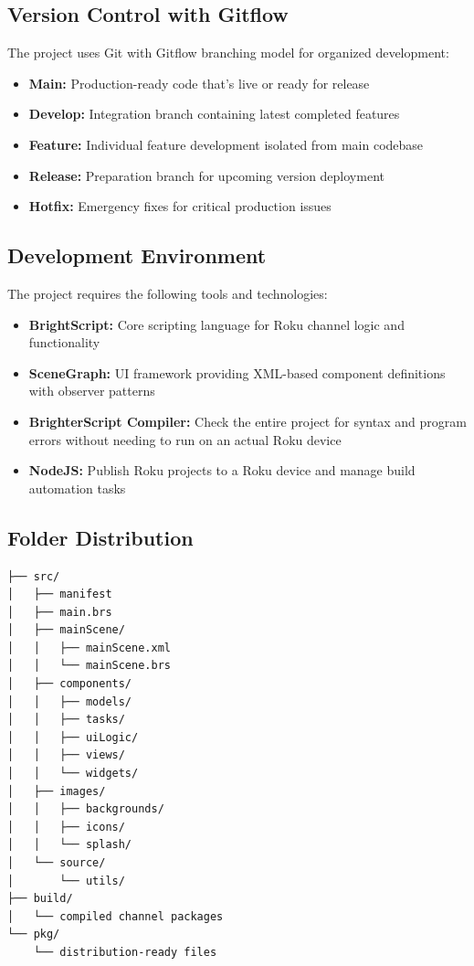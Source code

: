 \documentclass[11pt,letterpaper]{article}
\begin{document}
\subsection{Version Control with Gitflow}
The project uses Git with Gitflow branching model for organized development:
\begin{itemize}
    \item \textbf{Main:} Production-ready code that's live or ready for release
    \item \textbf{Develop:} Integration branch containing latest completed features
    \item \textbf{Feature:} Individual feature development isolated from main codebase
    \item \textbf{Release:} Preparation branch for upcoming version deployment
    \item \textbf{Hotfix:} Emergency fixes for critical production issues
\end{itemize}

\subsection{Development Environment}
The project requires the following tools and technologies:
\begin{itemize}
    \item \textbf{BrightScript:} Core scripting language for Roku channel logic and functionality
    \item \textbf{SceneGraph:} UI framework providing XML-based component definitions with observer patterns
    \item \textbf{BrighterScript Compiler:} Check the entire project for syntax and program errors without needing to run on an actual Roku device
    \item \textbf{NodeJS:} Publish Roku projects to a Roku device and manage build automation tasks
\end{itemize}

\subsection{Folder Distribution}
\begin{center}
\begin{minipage}{0.6\textwidth}
\begin{verbatim}
├── src/
│   ├── manifest
│   ├── main.brs
│   ├── mainScene/
│   │   ├── mainScene.xml
│   │   └── mainScene.brs
│   ├── components/
│   │   ├── models/
│   │   ├── tasks/
│   │   ├── uiLogic/
│   │   ├── views/
│   │   └── widgets/
│   ├── images/
│   │   ├── backgrounds/
│   │   ├── icons/
│   │   └── splash/
│   └── source/
│       └── utils/
├── build/
│   └── compiled channel packages
└── pkg/
    └── distribution-ready files
\end{verbatim}
\end{minipage}
\end{center}
\end{document}
